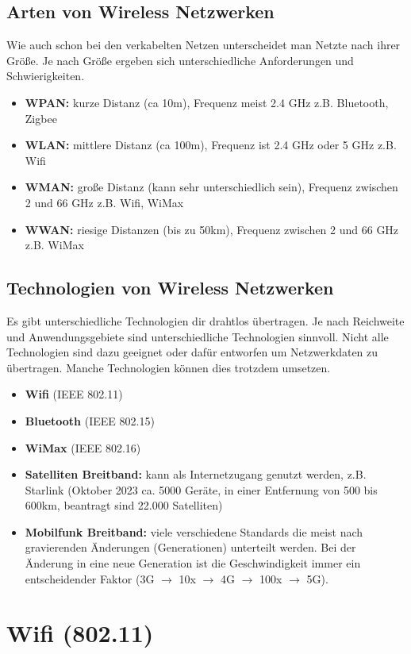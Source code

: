 \subsection*{Arten von Wireless Netzwerken}
Wie auch schon bei den verkabelten Netzen unterscheidet man Netzte nach ihrer Größe. Je nach Größe ergeben sich unterschiedliche Anforderungen und Schwierigkeiten.
\begin{itemize}
	\item \textbf{WPAN:} kurze Distanz (ca 10m), Frequenz meist 2.4 GHz z.B. Bluetooth, Zigbee
	\item \textbf{WLAN:} mittlere Distanz (ca 100m), Frequenz ist 2.4 GHz oder 5 GHz z.B. Wifi
	\item \textbf{WMAN:} große Distanz (kann sehr unterschiedlich sein), Frequenz zwischen 2 und 66 GHz z.B. Wifi, WiMax
	\item \textbf{WWAN:} riesige Distanzen (bis zu 50km), Frequenz zwischen 2 und 66 GHz z.B. WiMax
\end{itemize}

\subsection*{Technologien von Wireless Netzwerken}
Es gibt unterschiedliche Technologien dir drahtlos übertragen. Je nach Reichweite und Anwendungsgebiete sind unterschiedliche Technologien sinnvoll. Nicht alle Technologien sind dazu geeignet oder dafür entworfen um Netzwerkdaten zu übertragen. Manche Technologien können dies trotzdem umsetzen.
\begin{itemize}
	\item \textbf{Wifi} (IEEE 802.11)
	\item \textbf{Bluetooth} (IEEE 802.15)
	\item\textbf{ WiMax} (IEEE 802.16)
	\item \textbf{Satelliten Breitband:} kann als Internetzugang genutzt werden, z.B. Starlink (Oktober 2023 ca. 5000 Geräte, in einer Entfernung von 500 bis 600km, beantragt sind 22.000 Satelliten)
	\item \textbf{Mobilfunk Breitband:} viele verschiedene Standards die meist nach gravierenden Änderungen (Generationen) unterteilt werden. Bei der Änderung in eine neue Generation ist die Geschwindigkeit immer ein entscheidender Faktor (3G $\rightarrow$ 10x $\rightarrow$ 4G $\rightarrow$ 100x $\rightarrow$ 5G).
\end{itemize}

\section{Wifi (802.11)}
